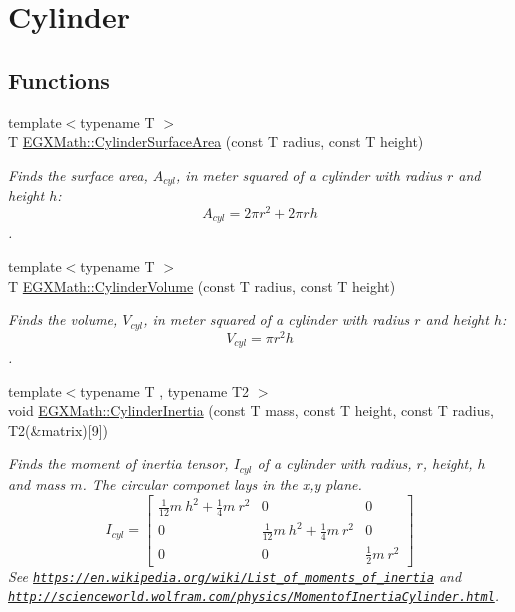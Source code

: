 \hypertarget{group___e_g_x_math-_geometry-_cylinder}{}\section{Cylinder}
\label{group___e_g_x_math-_geometry-_cylinder}
\subsection*{Functions}
\begin{DoxyCompactItemize}
\item 
{\footnotesize template$<$typename T $>$ }\\T \mbox{\hyperlink{group___e_g_x_math-_geometry-_cylinder_gaf14619f5d525e14150a43b9898adb258}{E\+G\+X\+Math\+::\+Cylinder\+Surface\+Area}} (const T radius, const T height)
\begin{DoxyCompactList}\small\item\em Finds the surface area, $A_{cyl}$, in meter squared of a cylinder with radius $r$ and height $h$\+: \[ A_{cyl}=2\pi r^2 + 2\pi r h \]. \end{DoxyCompactList}\item 
{\footnotesize template$<$typename T $>$ }\\T \mbox{\hyperlink{group___e_g_x_math-_geometry-_cylinder_ga9d1aa08f778f9ccbd79953063f11bc9b}{E\+G\+X\+Math\+::\+Cylinder\+Volume}} (const T radius, const T height)
\begin{DoxyCompactList}\small\item\em Finds the volume, $V_{cyl}$, in meter squared of a cylinder with radius $r$ and height $h$\+: \[ V_{cyl}=\pi r^2 h\]. \end{DoxyCompactList}\item 
{\footnotesize template$<$typename T , typename T2 $>$ }\\void \mbox{\hyperlink{group___e_g_x_math-_geometry-_cylinder_gae7dca080058b400feb0d69f78af7a850}{E\+G\+X\+Math\+::\+Cylinder\+Inertia}} (const T mass, const T height, const T radius, T2(\&matrix)\mbox{[}9\mbox{]})
\begin{DoxyCompactList}\small\item\em Finds the moment of inertia tensor, $I_{cyl}$ of a cylinder with radius, $r$, height, $h$ and mass $m$. The circular componet lays in the x,y plane. \[ I_{cyl}=\begin{bmatrix} \frac{1}{12}m\ h^2 + \frac{1}{4}m\ r^2 & 0 & 0\\ 0 & \frac{1}{12}m\ h^2 + \frac{1}{4}m\ r^2 & 0\\ 0 & 0 & \frac{1}{2}m\ r^2 \end{bmatrix} \] See \href{https://en.wikipedia.org/wiki/List_of_moments_of_inertia}{\tt https\+://en.\+wikipedia.\+org/wiki/\+List\+\_\+of\+\_\+moments\+\_\+of\+\_\+inertia} and \href{http://scienceworld.wolfram.com/physics/MomentofInertiaCylinder.html}{\tt http\+://scienceworld.\+wolfram.\+com/physics/\+Momentof\+Inertia\+Cylinder.\+html}. \end{DoxyCompactList}\item 

\end{DoxyCompactItemize}
